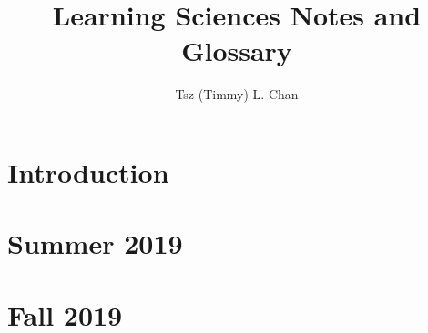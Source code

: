 \documentclass{LSRIarticle}
\title{Learning Sciences Notes and Glossary}	%
\author{Tsz (Timmy) L. Chan}	%
\affil{Learning Sciences Research Institute \\ University of Illinois at Chicago}
\begin{document}
\clearpage\maketitle
\thispagestyle{empty}

\section*{Introduction}

\newpage
\tableofcontents
\newpage
\listoffigures

\newpage

\section*{Summer 2019}
 

\newpage
\section{Fall 2019}

%


\newpage
\printglossary[type=\acronymtype]

\newpage
\printglossary



\newpage

\printbibliography[heading=bibintoc]
\end{document}
